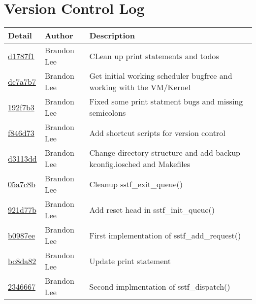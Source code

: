 \documentclass[letterpaper,10pt,titlepage]{article}
\begin{document}
\section{Version Control Log}

\begin{tabular}{l l l}\textbf{Detail} & \textbf{Author} & \textbf{Description}\\\hline
\href{https://github.com/brandonlee503/Operating-Systems-II/commit/d1787f12cc18301b0d264e55c117847cfbc1ddc4}{d1787f1} & Brandon Lee & CLean up print statements and todos\\\hline
\href{https://github.com/brandonlee503/Operating-Systems-II/commit/dc7a7b740312eeaff8f426bac4ea7b7e4dceb005}{dc7a7b7} & Brandon Lee & Get initial working scheduler bugfree and working with the VM/Kernel\\\hline
\href{https://github.com/brandonlee503/Operating-Systems-II/commit/192f7b3ece63a2b4059166cd1ad9455f5ca69a6d}{192f7b3} & Brandon Lee & Fixed some print statment bugs and missing semicolons\\\hline
\href{https://github.com/brandonlee503/Operating-Systems-II/commit/f846d738bc81c25666c8b2815ae603b9f8b34e66}{f846d73} & Brandon Lee & Add shortcut scripts for version control\\\hline
\href{https://github.com/brandonlee503/Operating-Systems-II/commit/d3113dd71f3b5073bc5ccfd5b9aaa08d55e0fb02}{d3113dd} & Brandon Lee & Change directory structure and add backup kconfig.iosched and Makefiles\\\hline
\href{https://github.com/brandonlee503/Operating-Systems-II/commit/05a7c8b6e4955f503678b0fb6bdec4922502f11c}{05a7c8b} & Brandon Lee & Cleanup sstf\_exit\_queue()\\\hline
\href{https://github.com/brandonlee503/Operating-Systems-II/commit/921d77bf114c91431870624ee635a9965ff74dbb}{921d77b} & Brandon Lee & Add reset head in sstf\_init\_queue()\\\hline
\href{https://github.com/brandonlee503/Operating-Systems-II/commit/b0987ee71ac38c5ed9d9885761c4d1d917a525e7}{b0987ee} & Brandon Lee & First implementation of sstf\_add\_request()\\\hline
\href{https://github.com/brandonlee503/Operating-Systems-II/commit/bc8da82910c721486bf1f3edfe3a388f58f48812}{bc8da82} & Brandon Lee & Update print statement\\\hline
\href{https://github.com/brandonlee503/Operating-Systems-II/commit/2346667f4d13de671a53501db64a0dd2d009d7e3}{2346667} & Brandon Lee & Second implmentation of sstf\_dispatch()\\\hline

\end{tabular}
\end{document}
